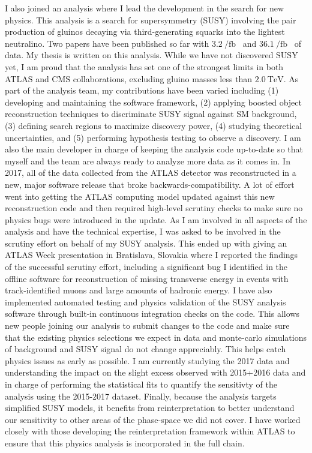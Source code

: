 \documentclass[letterpaper, 11pt]{article}
\begin{document}
I also joined an analysis where I lead the development in the search for new physics. This analysis is a search for supersymmetry (SUSY) involving the pair production of gluinos decaying via third-generating squarks into the lightest neutralino. Two papers have been published so far with $\SI{3.2}{\per\femto\barn}$~ and $\SI{36.1}{\per\femto\barn}$~ of data. My thesis is written on this analysis. While we have not discovered SUSY yet, I am proud that the analysis has set one of the strongest limits in both ATLAS and CMS collaborations, excluding gluino masses less than $\SI{2.0}{\tera\electronvolt}$. As part of the analysis team, my contributions have been varied including (1) developing and maintaining the software framework, (2) applying boosted object reconstruction techniques to discriminate SUSY signal against SM background, (3) defining search regions to maximize discovery power, (4) studying theoretical uncertainties, and (5) performing hypothesis testing to observe a discovery. I am also the main developer in charge of keeping the analysis code up-to-date so that myself and the team are always ready to analyze more data as it comes in. In 2017, all of the data collected from the ATLAS detector was reconstructed in a new, major software release that broke backwards-compatibility. A lot of effort went into getting the ATLAS computing model updated against this new reconstruction code and then required high-level scrutiny checks to make sure no physics bugs were introduced in the update. As I am involved in all aspects of the analysis and have the technical expertise, I was asked to be involved in the scrutiny effort on behalf of my SUSY analysis. This ended up with giving an ATLAS Week presentation in Bratislava, Slovakia where I reported the findings of the successful scrutiny effort, including a significant bug I identified in the offline software for reconstruction of missing transverse energy in events with track-identified muons and large amounts of hadronic energy. I have also implemented automated testing and physics validation of the SUSY analysis software through built-in continuous integration checks on the code. This allows new people joining our analysis to submit changes to the code and make sure that the existing physics selections we expect in data and monte-carlo simulations of background and SUSY signal do not change appreciably. This helps catch physics issues as early as possible. I am currently studying the 2017 data and understanding the impact on the slight excess observed with 2015+2016 data and in charge of performing the statistical fits to quantify the sensitivty of the analysis using the 2015-2017 dataset. Finally, because the analysis targets simplified SUSY models, it benefits from reinterpretation to better understand our sensitivity to other areas of the phase-space we did not cover. I have worked closely with those developing the reinterpretation framework within ATLAS to ensure that this physics analysis is incorporated in the full chain.
\end{document}
